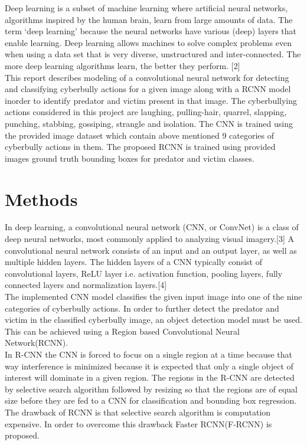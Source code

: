 \documentclass[12pt]{article}
\begin{document}
Deep learning is a subset of machine learning where artificial neural networks, algorithms inspired by the human brain, learn from large amounts of data. The term  ‘deep learning’ because the neural networks have various (deep) layers that enable learning. Deep learning allows machines to solve complex problems even when using a data set that is very diverse, unstructured and inter-connected. The more deep learning algorithms learn, the better they perform. [2] \\

This report describes modeling of a convolutional neural network for detecting and classifying cyberbully actions for a given image along with a RCNN model inorder to identify predator and victim present in that image. The cyberbullying actions considered in this project are laughing, pulling-hair, quarrel, slapping, punching, stabbing, gossiping, strangle and isolation. The CNN is trained using the provided image dataset which contain above mentioned 9 categories of cyberbully actions in them. The proposed RCNN is trained using provided images ground truth bounding boxes for predator and victim classes.    

\newpage

\section{Methods}
In deep learning, a convolutional neural network (CNN, or ConvNet) is a class of deep neural networks, most commonly applied to analyzing visual imagery.[3] A convolutional neural network consists of an input and an output layer, as well as multiple hidden layers. The hidden layers of a CNN typically consist of convolutional layers, ReLU layer i.e. activation function, pooling layers, fully connected layers and normalization layers.[4] \\ 

The implemented CNN model classifies the given input image into one of the nine categories of cyberbully actions. In order to further detect the predator and victim in the classified cyberbully image, an object detection model must be used. This can be achieved using a Region based Convolutional Neural Network(RCNN). \\

In R-CNN the CNN is forced to focus on a single region at a time because that way interference is minimized because it is expected that only a single object of interest will dominate in a given region. The regions in the R-CNN are detected by selective search algorithm followed by resizing so that the regions are of equal size before they are fed to a CNN for classification and bounding box regression. The drawback of RCNN is that selective search algorithm is computation expensive. In order to overcome this drawback Faster RCNN(F-RCNN) is proposed. \\
\end{document}
